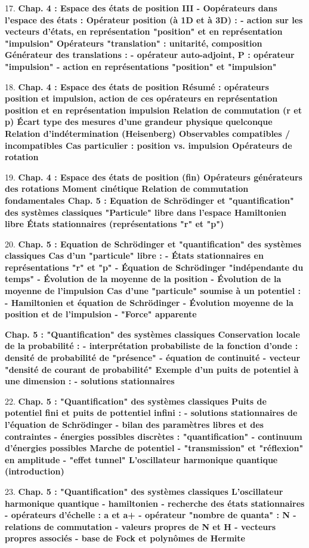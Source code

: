 17.
\bf{Chap. 4 : Espace des états de position}
\bf{III - Oopérateurs dans l'espace des états :}
Opérateur position (à 1D et à 3D) :
- action sur les vecteurs d'états, en représentation "position" et en représentation "impulsion"
Opérateurs "translation" : unitarité, composition
Générateur des translations :
- opérateur auto-adjoint, P : opérateur "impulsion"
- action en représentations "position" et "impulsion"

18.
\bf{Chap. 4 : Espace des états de position}
\bf{Résumé :} opérateurs position et impulsion, action de ces opérateurs en représentation position et en représentation impulsion
Relation de commutation (r et p)
Écart type des mesures d'une grandeur physique quelconque
Relation d'indétermination (Heisenberg)
Observables compatibles / incompatibles
Cas particulier : position vs. impulsion
Opérateurs de rotation

19.
\bf{Chap. 4 : Espace des états de position (fin)}
Opérateurs générateurs des rotations
Moment cinétique
Relation de commutation fondamentales
\bf{Chap. 5 : Equation de Schrödinger et "quantification" des systèmes classiques}
"Particule" libre dans l'espace
Hamiltonien libre
États stationnaires (représentations "r" et "p")

20.
\bf{Chap. 5 : Equation de Schrödinger et "quantification" des systèmes classiques}
Cas d'un "particule" libre :
- États stationnaires en représentations "r" et "p"
- Équation de Schrödinger "indépendante du temps"
- Évolution de la moyenne de la position
- Évolution de la moyenne de l'impulsion
Cas d'une "particule" soumise à un potentiel :
- Hamiltonien et équation de Schrödinger
- Évolution moyenne de la position et de l'impulsion
- "Force" apparente

\bf{Chap. 5 : "Quantification" des systèmes classiques}
Conservation locale de la probabilité :
- interprétation probabiliste de la fonction d'onde : densité de probabilité de "présence"
- équation de continuité
- vecteur "densité de courant de probabilité"
Exemple d'un puits de potentiel à une dimension :
- solutions stationnaires

22.
\bf{Chap. 5 : "Quantification" des systèmes classiques}
Puits de potentiel fini et puits de pottentiel infini :
- solutions stationnaires de l'équation de Schrödinger
- bilan des paramètres libres et des contraintes
- énergies possibles discrètes : "quantification"
- continuum d'énergies possibles
Marche de potentiel
- "transmission" et "réflexion" en amplitude
- "effet tunnel"
L'oscillateur harmonique quantique (introduction)

23.
\bf{Chap. 5 : "Quantification" des systèmes classiques}
L'oscillateur harmonique quantique
- hamiltonien
- recherche des états stationnaires
- opérateurs d'échelle : a et a+
- opérateur "nombre de quanta" : N
- relations de commutation
- valeurs propres de N et H
- vecteurs propres associés
- base de Fock et polynômes de Hermite
